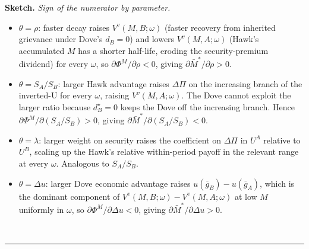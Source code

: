 \documentclass[11pt,twoside]{extarticle}
\newenvironment{proof}[1][Proof]{\noindent \textbf{#1.} }{\ \rule{0.5em}{0.5em}}
\begin{document}
\begin{proof}[Sketch]
\textit{Sign of the numerator by parameter.}
\begin{itemize}
    \item $\theta = \rho$: faster decay raises $V^v(M, B; \omega)$ (faster
    recovery from inherited grievance under Dove's $d_B = 0$) and lowers
    $V^v(M, A; \omega)$ (Hawk's accumulated $M$ has a shorter half-life, eroding
    the security-premium dividend) for every $\omega$, so
    $\partial \Phi^M / \partial \rho < 0$, giving
    $\partial \bar M^* / \partial \rho > 0$.
    \item $\theta = S_A / S_B$: larger Hawk advantage raises $\Delta\Pi$
    on the increasing branch of the inverted-U for every $\omega$, raising $V^v(M, A; \omega)$. The
    Dove cannot exploit the larger ratio because $d_B^\star = 0$ keeps
    the Dove off the increasing branch. Hence
    $\partial \Phi^M / \partial(S_A/S_B) > 0$, giving
    $\partial \bar M^* / \partial(S_A/S_B) < 0$.
    \item $\theta = \lambda$: larger weight on security raises the
    coefficient on $\Delta\Pi$ in $U^A$ relative to $U^B$, scaling up the
    Hawk's relative within-period payoff in the relevant range at every $\omega$.
    Analogous to $S_A / S_B$.
    \item $\theta = \Delta u$: larger Dove economic advantage raises
    $u(\bar g_B) - u(\bar g_A)$, which is the dominant component of
    $V^v(M, B; \omega) - V^v(M, A; \omega)$ at low $M$ uniformly in $\omega$, so
    $\partial \Phi^M / \partial \Delta u < 0$, giving
    $\partial \bar M^* / \partial \Delta u > 0$.
\end{itemize}
\end{proof}



\end{document}
